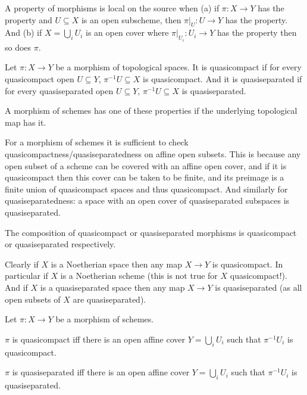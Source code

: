 \bdefn

    A property of morphisms is {\emphcolor local on the source} when (a) if $\pi\colon X\to Y$
    has the property and $U\subseteq X$ is an open subscheme, then $\pi|_U\colon U\to Y$ has the property.
    And (b) if $X=\bigcup_iU_i$ is an open cover where $\pi|_{U_i}\colon U_i\to Y$ has the property then
    so does $\pi$.

\edefn

\bdefn

    Let $\pi\colon X\to Y$ be a morphism of topological spaces.
    It is {\emphcolor quasicompact} if for every quasicompact open $U\subseteq Y$, $\pi^{-1}U\subseteq X$
    is quasicompact.
    And it is {\emphcolor quasiseparated} if for every quasiseparated open $U\subseteq Y$,
    $\pi^{-1}U\subseteq X$ is quasiseparated.

    A morphism of schemes has one of these properties if the underlying topological map has it.

\edefn

For a morphism of schemes it is sufficient to check quasicompactness/quasiseparatedness on affine open subsets.
This is because any open subset of a scheme can be covered with an affine open cover, and if it is
quasicompact then this cover can be taken to be finite, and its preimage is a finite union of quasicompact
spaces and thus quasicompact.
And similarly for quasiseparatedness: a space with an open cover of quasiseparated subspaces is quasiseparated.

The composition of quasicompact or quasiseparated morphisms is quasicompact or quasiseparated respectively.

\bexam

    Clearly if $X$ is a Noetherian space then any map $X\to Y$ is quasicompact.
    In particular if $X$ is a Noetherian scheme (this is not true for $X$ quasicompact!).
    And if $X$ is a quasiseparated space then any map $X\to Y$ is quasiseparated (as all open subsets of
    $X$ are quasiseparated).

\eexam

\bprop

    Let $\pi\colon X\to Y$ be a morphism of schemes.
    \benum
        \item $\pi$ is quasicompact iff there is an open affine cover $Y=\bigcup_iU_i$ such that $\pi^{-1}U_i$ is quasicompact.
        \item $\pi$ is quasiseparated iff there is an open affine cover $Y=\bigcup_iU_i$ such that $\pi^{-1}U_i$ is quasiseparated.
    \eenum

